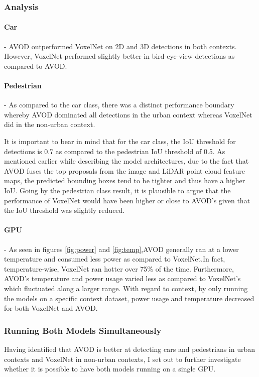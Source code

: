\subsubsection*{Analysis}
\paragraph{Car} - AVOD outperformed VoxelNet on 2D and 3D detections in both contexts. However, VoxelNet performed slightly better in bird-eye-view detections as compared to AVOD. 
\paragraph{Pedestrian} - As compared to the car class, there was a distinct performance boundary whereby AVOD dominated all detections in the urban context whereas VoxelNet did in the non-urban context.

It is important to bear in mind that for the car class, the IoU threshold for detections is 0.7 as compared to the pedestrian IoU threshold of 0.5. As mentioned earlier while describing the model architectures, due to the fact that AVOD fuses the top proposals from the image and LiDAR point cloud feature maps, the predicted bounding boxes tend to be tighter and thus have a higher IoU. Going by the pedestrian class result, it is plausible to argue that the performance of VoxelNet would have been higher or close to AVOD's given that the IoU threshold was slightly reduced. 

\paragraph{GPU} - As seen in figures \ref{fig:power} and \ref{fig:temp},AVOD generally ran at a lower temperature and consumed less power as compared to VoxelNet.In fact, temperature-wise, VoxelNet ran hotter over 75\% of the time.  Furthermore, AVOD's temperature and power usage varied less  as compared to VoxelNet's which fluctuated along a larger range. 
With regard to context, by only running the models on a specific context dataset, power usage and temperature decreased for both VoxelNet and AVOD. 

\subsubsection*{Running Both Models Simultaneously}
Having identified that AVOD is better at detecting cars and pedestrians in urban contexts and VoxelNet in non-urban contexts, I set out to further investigate whether it is possible to have both models running on a single GPU. 

